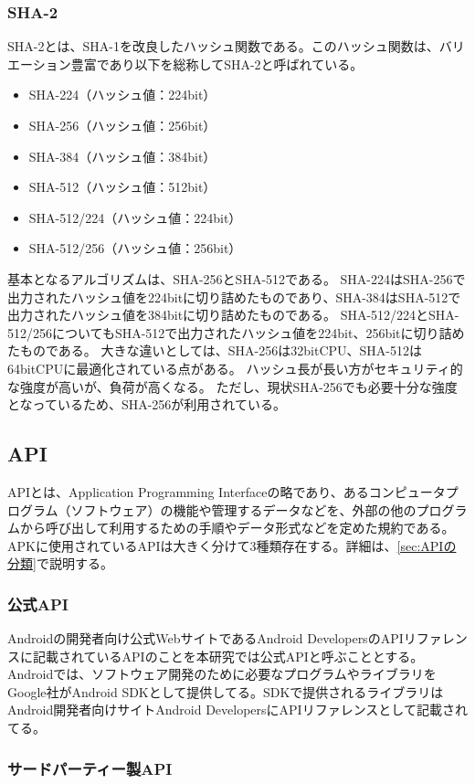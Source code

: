 \subsubsection{SHA-2}
SHA-2とは、SHA-1を改良したハッシュ関数である。このハッシュ関数は、バリエーション豊富であり以下を総称してSHA-2と呼ばれている。
\begin{itemize}
\item SHA-224（ハッシュ値：224bit）
\item SHA-256（ハッシュ値：256bit）
\item SHA-384（ハッシュ値：384bit）
\item SHA-512（ハッシュ値：512bit）
\item SHA-512/224（ハッシュ値：224bit）
\item SHA-512/256（ハッシュ値：256bit）
\end{itemize}
基本となるアルゴリズムは、SHA-256とSHA-512である。
SHA-224はSHA-256で出力されたハッシュ値を224bitに切り詰めたものであり、SHA-384はSHA-512で出力されたハッシュ値を384bitに切り詰めたものである。
SHA-512/224とSHA-512/256についてもSHA-512で出力されたハッシュ値を224bit、256bitに切り詰めたものである。
大きな違いとしては、SHA-256は32bitCPU、SHA-512は64bitCPUに最適化されている点がある。
ハッシュ長が長い方がセキュリティ的な強度が高いが、負荷が高くなる。
ただし、現状SHA-256でも必要十分な強度となっているため、SHA-256が利用されている。


\subsection{API}
APIとは、Application Programming Interfaceの略であり、あるコンピュータプログラム（ソフトウェア）の機能や管理するデータなどを、外部の他のプログラムから呼び出して利用するための手順やデータ形式などを定めた規約である。\\APKに使用されているAPIは大きく分けて3種類存在する。詳細は、\ref{sec:APIの分類}で説明する。
\subsubsection {公式API}
Androidの開発者向け公式WebサイトであるAndroid DevelopersのAPIリファレンスに記載されているAPIのことを本研究では公式APIと呼ぶこととする。
Androidでは、ソフトウェア開発のために必要なプログラムやライブラリをGoogle社がAndroid SDKとして提供してる。SDKで提供されるライブラリはAndroid開発者向けサイトAndroid DevelopersにAPIリファレンスとして記載されてる。
\subsubsection {サードパーティー製API}

